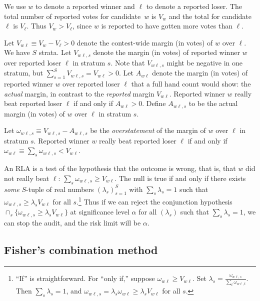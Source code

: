 \documentclass[runningheads]{llncs}
\begin{document}
We use $w$ to denote a reported winner and $\ell$ to denote a reported loser.
The total number of reported votes for candidate~$w$ is $V_{w}$ 
and the total for candidate~$\ell$ is $V_{\ell}$.
Thus $V_{w} > V_{\ell}$, since $w$ is reported to have gotten more votes than $\ell$.

Let $V_{w\ell} \equiv V_{w} - V_{\ell} > 0$ denote the contest-wide margin (in votes) of 
$w$ over  $\ell$.
We have $S$ strata.
Let $V_{w\ell,s}$ denote the margin (in votes) of reported winner $w$ over reported loser $\ell$
in stratum $s$. 
Note that $V_{w\ell,s}$ might be negative in one stratum, but $\sum_{s=1}^S V_{w\ell,s} = V_{w\ell} > 0$.
Let $A_{w\ell}$ denote the margin (in votes) of reported winner $w$ over reported loser $\ell$ that  a full hand count would show: the \emph{actual} margin, in contrast to the \emph{reported} margin $V_{w\ell}$.
Reported winner $w$ really beat reported loser $\ell$ if and only if $A_{w\ell} > 0$.
Define $A_{w\ell,s}$ to be the actual margin (in votes) of $w$ over $\ell$ in stratum $s$.

Let $\omega_{w\ell,s} \equiv V_{w\ell,s} - A_{w\ell,s}$ be the \emph{overstatement}
of the margin of $w$ over $\ell$ in stratum $s$.
Reported winner $w$ really beat reported loser 
$\ell$ if and only if $\omega_{w\ell} \equiv \sum_s \omega_{w\ell,s} < V_{w\ell}$.

An RLA is a test of the hypothesis that the outcome is wrong, that is, that $w$ did not really beat $\ell$:
$\sum_s \omega_{w\ell, s} \ge V_{w\ell}$.
The null is true if and only if there exists \textit{some} $S$-tuple of real numbers $(\lambda_s)_{s=1}^S$ with $\sum_s \lambda_s = 1$ such that $\omega_{w\ell, s} \ge \lambda_s V_{w\ell}$ for all $s$.\footnote{%
  ``If'' is straightforward. For ``only if,'' suppose $\omega_{w\ell} \ge V_{w\ell}$. Set $\lambda_s = \frac{\omega_{w\ell, s}}{\sum_t \omega_{w\ell, t}}$. Then $\sum_s \lambda_s = 1$, and $\omega_{w\ell, s} = \lambda_s \omega_{w\ell} \ge \lambda_s V_{w\ell}$ for all $s$.
}
Thus if we can reject the conjunction hypothesis $\cap_s \{ \omega_{w\ell,s} \ge \lambda_s V_{w\ell} \}$ at significance level $\alpha$ for all $(\lambda_s)$ such that $\sum_s \lambda_s = 1$, we can stop the audit, and the risk limit will be $\alpha$.

\subsection{Fisher's combination method}
\end{document}
